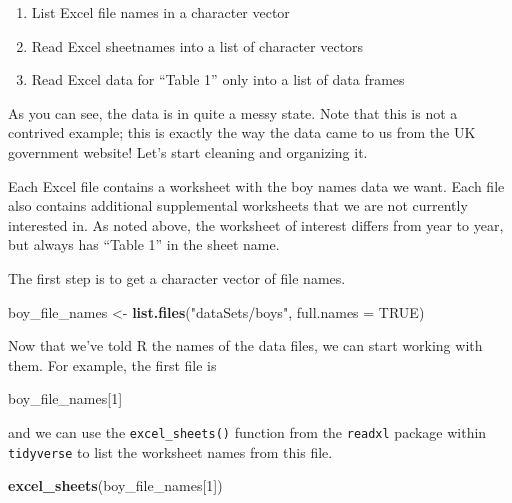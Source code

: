 \documentclass[
]{book}
\newenvironment{Shaded}{\begin{snugshade}}{\end{snugshade}}
\newcommand{\DataTypeTok}[1]{\textcolor[rgb]{0.13,0.29,0.53}{#1}}
\newcommand{\DecValTok}[1]{\textcolor[rgb]{0.00,0.00,0.81}{#1}}
\newcommand{\KeywordTok}[1]{\textcolor[rgb]{0.13,0.29,0.53}{\textbf{#1}}}
\newcommand{\NormalTok}[1]{#1}
\newcommand{\OtherTok}[1]{\textcolor[rgb]{0.56,0.35,0.01}{#1}}
\newcommand{\StringTok}[1]{\textcolor[rgb]{0.31,0.60,0.02}{#1}}
\providecommand{\tightlist}{%
  \setlength{\itemsep}{0pt}\setlength{\parskip}{0pt}}
\begin{document}
\begin{enumerate}
\def\labelenumi{\arabic{enumi}.}
\tightlist
\item
  List Excel file names in a character vector
\item
  Read Excel sheetnames into a list of character vectors
\item
  Read Excel data for ``Table 1'' only into a list of data frames
\end{enumerate}

As you can see, the data is in quite a messy state. Note that this is
not a contrived example; this is exactly the way the data came to us
from the UK government website! Let's start cleaning and organizing
it.

Each Excel file contains a worksheet with the boy names data we want.
Each file also contains additional supplemental worksheets that we are
not currently interested in. As noted above, the worksheet of interest
differs from year to year, but always has ``Table 1'' in the sheet name.

The first step is to get a character vector of file names.

\begin{Shaded}
\begin{Highlighting}[]
\NormalTok{boy_file_names <-}\StringTok{ }\KeywordTok{list.files}\NormalTok{(}\StringTok{"dataSets/boys"}\NormalTok{, }\DataTypeTok{full.names =} \OtherTok{TRUE}\NormalTok{)}
\end{Highlighting}
\end{Shaded}

Now that we've told R the names of the data files, we can start working
with them. For example, the first file is

\begin{Shaded}
\begin{Highlighting}[]
\NormalTok{boy_file_names[}\DecValTok{1}\NormalTok{]}
\end{Highlighting}
\end{Shaded}

and we can use the \texttt{excel\_sheets()} function from the \texttt{readxl} package
within \texttt{tidyverse} to list the worksheet names from this file.

\begin{Shaded}
\begin{Highlighting}[]
\KeywordTok{excel_sheets}\NormalTok{(boy_file_names[}\DecValTok{1}\NormalTok{])}
\end{Highlighting}
\end{Shaded}
\end{document}
